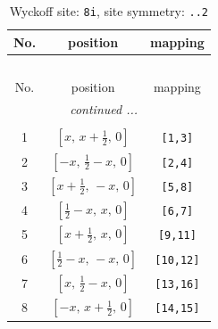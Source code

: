 \documentclass[fleqn,8pt]{jsarticle}
\begin{document}
\renewcommand{\arraystretch}{1.2}
\begin{longtable}{ccc}
\caption{Wyckoff site: {\tt 8i}, site symmetry: {\tt ..2}}
 \\
 \hline \hline
No. & position & mapping \\ \hline \endfirsthead

\multicolumn{2}{l}{\tablename\ \thetable{}} \\
 \hline \hline
No. & position & mapping \\ \hline \endhead

 \hline \hline
\multicolumn{2}{r}{\footnotesize\it continued ...} \\ \endfoot

 \hline \hline
\multicolumn{2}{r}{} \\ \endlastfoot

1 & $\left[ x,\, x + \frac{1}{2},\, 0 \right]$ & {\tt [1,3]} \\ \hline
2 & $\left[ - x,\, \frac{1}{2} - x,\, 0 \right]$ & {\tt [2,4]} \\ \hline
3 & $\left[ x + \frac{1}{2},\, - x,\, 0 \right]$ & {\tt [5,8]} \\ \hline
4 & $\left[ \frac{1}{2} - x,\, x,\, 0 \right]$ & {\tt [6,7]} \\ \hline
5 & $\left[ x + \frac{1}{2},\, x,\, 0 \right]$ & {\tt [9,11]} \\ \hline
6 & $\left[ \frac{1}{2} - x,\, - x,\, 0 \right]$ & {\tt [10,12]} \\ \hline
7 & $\left[ x,\, \frac{1}{2} - x,\, 0 \right]$ & {\tt [13,16]} \\ \hline
8 & $\left[ - x,\, x + \frac{1}{2},\, 0 \right]$ & {\tt [14,15]} \\
\end{longtable}
\renewcommand{\arraystretch}{1.2}
\end{document}
